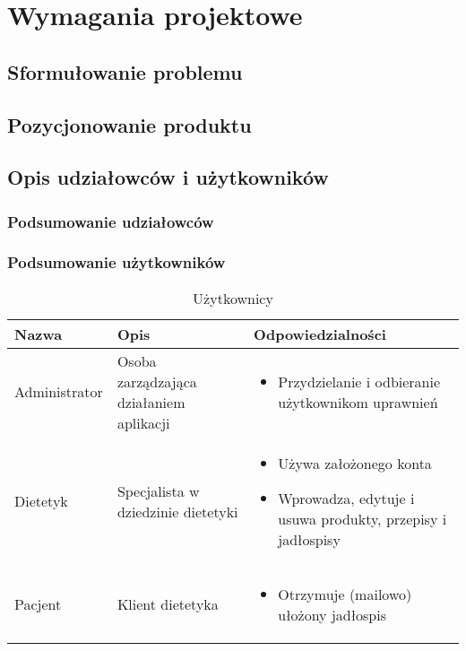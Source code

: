 \chapter{Wymagania projektowe}
\section{Sformułowanie problemu}
\section{Pozycjonowanie produktu}
\section{Opis udziałowców i użytkowników}
\subsection{Podsumowanie udziałowców}
\subsection{Podsumowanie użytkowników}

\begin{minipage}{\textwidth}
    \begin{table}[H]
        \centering\caption{Użytkownicy \label{tabela:uzytkownicy}}
        \begin{tabular}{|p{}|p{}|p{}|}

            \hline
            Nazwa & Opis & Odpowiedzialności\\

            \hline
            Administrator &
            Osoba zarządzająca działaniem aplikacji &
            \begin{itemize}
                \item Przydzielanie i odbieranie użytkownikom uprawnień
            \end{itemize} \\
            \hline
            Dietetyk &
            Specjalista w dziedzinie dietetyki &
            \begin{itemize}
                \item Używa założonego konta
                \item Wprowadza, edytuje i usuwa produkty, przepisy i jadłospisy
            \end{itemize} \\
            \hline
            Pacjent &
            Klient dietetyka &
            \begin{itemize}
                \item Otrzymuje (mailowo) ułożony jadłospis
            \end{itemize} \\
            \hline
        \end{tabular}
    \end{table}
\end{minipage}

